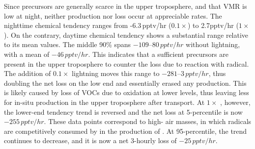 Since  precursors are generally scarce in the upper troposphere, and that  VMR is low at night,
neither production nor loss occur at appreciable rates. The nighttime  chemical tendency ranges from
-6.3\,\unit{pptv/hr} ($0.1\times$) to 2.7\unit{pptv/hr} ($1\times$). On the contrary, daytime  chemical tendency
shows a substantial range relative to its mean values. The middle 90\% spans $-109$--$80\,\unit{pptv/hr}$ without lightning,
with a mean of $-46\,\unit{pptv/hr}$. This indicates that a sufficient  precursors are present in the upper
troposphere to counter the loss due to reaction with  radical. The addition of $0.1\times$ lightning 
moves this range to $-281$--$3\,\unit{pptv/hr}$, thus doubling the net loss on the low end and essentially erased any
production. This is likely caused by loss of VOCs due to oxidation at lower levels, thus leaving less for in-situ 
production in the upper troposphere after transport. At $1\times$ {\lnox}, however, the lower-end tendency trend is
reversed and the net loss at 5-percentile is now $-255\,\unit{pptv/hr}$. These data points correspond to high-{\lnox} air
masses, in which  radicals are competitively consumed by  in the production of .
At 95-percentile, the trend continues to decrease, and it is now a net 3-hourly loss of $-25\,\unit{pptv/hr}$.

